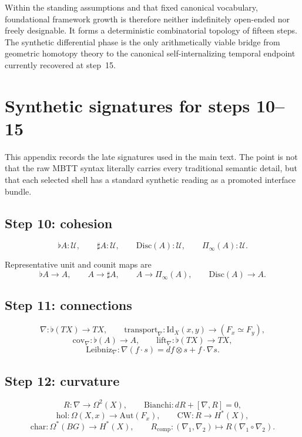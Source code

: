 \documentclass[11pt]{article}
\theoremstyle{plain}
\theoremstyle{definition}
\theoremstyle{remark}
\newcommand{\U}{\mathcal{U}}
\newcommand{\Shape}{\Pi_{\!\infty}}
\newcommand{\Disc}{\mathrm{Disc}}
\newcommand{\hol}{\mathrm{hol}}
\newcommand{\charclass}{\mathrm{char}}
\newcommand{\Id}{\mathrm{Id}}
\begin{document}
Within the standing assumptions and that fixed canonical vocabulary, foundational framework growth is therefore neither indefinitely open-ended nor freely designable. It forms a deterministic combinatorial topology of fifteen steps. The synthetic differential phase is the only arithmetically viable bridge from geometric homotopy theory to the canonical self-internalizing temporal endpoint currently recovered at step~15.

\appendix

\section{Synthetic signatures for steps 10--15}

This appendix records the late signatures used in the main text. The point is not that the raw MBTT syntax literally carries every traditional semantic detail, but that each selected shell has a standard synthetic reading as a promoted interface bundle.

\subsection{Step 10: cohesion}

\[
  \flat A:\U,
  \qquad
  \sharp A:\U,
  \qquad
  \Disc(A):\U,
  \qquad
  \Shape(A):\U.
\]

Representative unit and counit maps are
\[
  \flat A\to A,
  \qquad
  A\to \sharp A,
  \qquad
  A\to \Shape(A),
  \qquad
  \Disc(A)\to A.
\]

\subsection{Step 11: connections}

\[
  \nabla:\flat(TX)\to TX,
  \qquad
  \mathrm{transport}_\nabla:\Id_X(x,y)\to(F_x\simeq F_y),
\]
\[
  \mathrm{cov}_\nabla:\flat(A)\to A,
  \qquad
  \mathrm{lift}_\nabla:\flat(TX)\to TX,
\]
\[
  \mathrm{Leibniz}_\nabla:\nabla(f\cdot s)=df\otimes s + f\cdot\nabla s.
\]

\subsection{Step 12: curvature}

\[
  R:\nabla\to\Omega^2(X),
  \qquad
  \mathrm{Bianchi}: dR+[\nabla,R]=0,
\]
\[
  \hol:\Omega(X,x)\to\mathrm{Aut}(F_x),
  \qquad
  \mathrm{CW}:R\to H^*(X),
\]
\[
  \charclass:\Omega^*(BG)\to H^*(X),
  \qquad
  R_{\mathrm{comp}}:(\nabla_1,\nabla_2)\mapsto R(\nabla_1\circ\nabla_2).
\]
\end{document}
